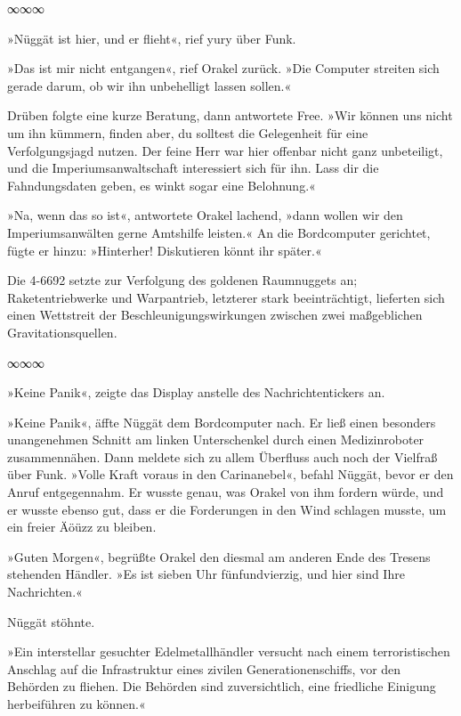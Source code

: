 \begin{center}
∞∞∞
\end{center}

»Nüggät ist hier, und er flieht«, rief yury über Funk.

»Das ist mir nicht entgangen«, rief Orakel zurück. »Die Computer streiten sich gerade darum, ob wir ihn unbehelligt lassen sollen.«

Drüben folgte eine kurze Beratung, dann antwortete Free. »Wir können uns nicht um ihn kümmern, finden aber, du solltest die Gelegenheit für eine Verfolgungsjagd nutzen. Der feine Herr war hier offenbar nicht ganz unbeteiligt, und die Imperiumsanwaltschaft interessiert sich für ihn. Lass dir die Fahndungsdaten geben, es winkt sogar eine Belohnung.«

»Na, wenn das so ist«, antwortete Orakel lachend, »dann wollen wir den Imperiumsanwälten gerne Amtshilfe leisten.« An die Bordcomputer gerichtet, fügte er hinzu: »Hinterher! Diskutieren könnt ihr später.«

Die 4-6692 setzte zur Verfolgung des goldenen Raumnuggets an; Raketentriebwerke und Warpantrieb, letzterer stark beeinträchtigt, lieferten sich einen Wettstreit der Beschleunigungswirkungen zwischen zwei maßgeblichen Gravitationsquellen.

\begin{center}
∞∞∞
\end{center}

»Keine Panik«, zeigte das Display anstelle des Nachrichtentickers an.

»Keine Panik«, äffte Nüggät dem Bordcomputer nach. Er ließ einen besonders unangenehmen Schnitt am linken Unterschenkel durch einen Medizinroboter zusammennähen. Dann meldete sich zu allem Überfluss auch noch der Vielfraß über Funk. »Volle Kraft voraus in den Carinanebel«, befahl Nüggät, bevor er den Anruf entgegennahm. Er wusste genau, was Orakel von ihm fordern würde, und er wusste ebenso gut, dass er die Forderungen in den Wind schlagen musste, um ein freier Äöüzz zu bleiben.

»Guten Morgen«, begrüßte Orakel den diesmal am anderen Ende des Tresens stehenden Händler. »Es ist sieben Uhr fünfundvierzig, und hier sind Ihre Nachrichten.«

Nüggät stöhnte.

»Ein interstellar gesuchter Edelmetallhändler versucht nach einem terroristischen Anschlag auf die Infrastruktur eines zivilen Generationenschiffs, vor den Behörden zu fliehen. Die Behörden sind zuversichtlich, eine friedliche Einigung herbeiführen zu können.«

